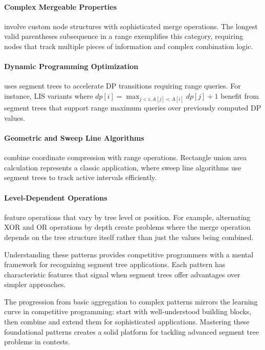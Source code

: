 
\paragraph{Complex Mergeable Properties} involve custom node structures with sophisticated merge operations. The longest valid parentheses subsequence in a range exemplifies this category, requiring nodes that track multiple pieces of information and complex combination logic.

\paragraph{Dynamic Programming Optimization} uses segment trees to accelerate DP transitions requiring range queries. For instance, LIS variants where $dp[i] = \max_{j < i, A[j] < A[i]} dp[j] + 1$ benefit from segment trees that support range maximum queries over previously computed DP values.


\paragraph{Geometric and Sweep Line Algorithms} combine coordinate compression with range operations. Rectangle union area calculation represents a classic application, where sweep line algorithms use segment trees to track active intervals efficiently.

\paragraph{Level-Dependent Operations} feature operations that vary by tree level or position. For example, alternating XOR and OR operations by depth create problems where the merge operation depends on the tree structure itself rather than just the values being combined.

Understanding these patterns provides competitive programmers with a mental framework for recognizing segment tree applications. Each pattern has characteristic features that signal when segment trees offer advantages over simpler approaches.

The progression from basic aggregation to complex patterns mirrors the learning curve in competitive programming: start with well-understood building blocks, then combine and extend them for sophisticated applications. Mastering these foundational patterns creates a solid platform for tackling advanced segment tree problems in contests.